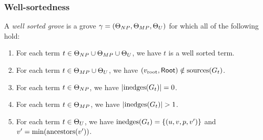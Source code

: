 
\subsubsection{Well-sortedness}

\begin{definition}
  A \emph{well sorted grove} is a grove $\gamma = (\Set[NP], \Set[MP], \Set[U])$ for which all of the following hold:
  \begin{enumerate}
    \item For each term $t \in \Set[NP] \cup \Set[MP] \cup \Set[U]$, we have $t$ is a well sorted term.
    \item For each term $t \in \Set[MP] \cup \Set[U]$, we have $(\rootVertex, \Root) \notin \sources{G_t}$.
    \item For each term $t \in \Set[NP]$, we have $\SizeOf{\inedges{G_t}} = 0$.
    \item For each term $t \in \Set[MP]$, we have $\SizeOf{\inedges{G_t}} > 1$.
    \item For each term $t \in \Set[U]$, we have $\inedges{G_t} = \SetOf{(u, v, p, v')}$ and $v' = \min{\ancestors{v'}}$.
  \end{enumerate}
\end{definition}

